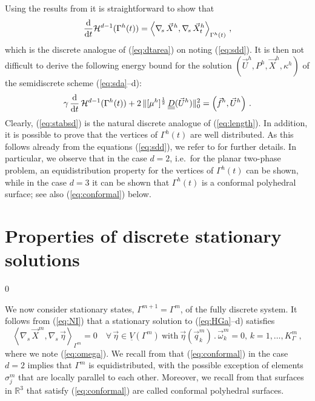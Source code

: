 \documentclass[a4paper,12pt,onecolumn]{article}
\newcommand{\R}{{\mathbb R}}
\newcommand{\Vh}{\underline{V}(\Gamma^m)}
\newcommand{\nabs}{\nabla_{\!s}}
\newcommand{\ddt}{\frac{\rm d}{{\rm d}t}}
\newcommand{\mat}[1]{\underline{\underline{#1}}\rule{0pt}{0pt}}
\begin{document}
Using the results from \cite{gflows3d} it is straightforward to show that
\begin{equation*}
\ddt \mathcal{H}^{d-1}(\Gamma^h(t)) = \left\langle \nabs\,\vec{X}^h, \nabs\,\vec{X}^h_t \right\rangle_{\Gamma^h(t)} \,,
\end{equation*}
which is the discrete analogue of  (\ref{eq:dtarea}) on noting (\ref{eq:sdd}). It is then not difficult to derive the following energy bound for the solution $(\vec U^h, P^h, \vec{X}^h, \kappa^h)$ of the semidiscrete scheme (\ref{eq:sda}--d):
\begin{equation}\label{eq:stabsd}
\gamma\,\ddt\,\mathcal{H}^{d-1}(\Gamma^h(t)) + 2\,\|[\mu^h]^\frac12\,\mat D(\vec U^h)\|^2_{0} = \left(\vec f^h, \vec U^h\right) \,.
\end{equation}
Clearly, (\ref{eq:stabsd}) is the natural discrete analogue of (\ref{eq:length}). In addition, it is possible to prove that the vertices of $\Gamma^h(t)$ are well distributed. As this follows already from the equations (\ref{eq:sdd}), we refer to \cite{triplej,gflows3d} for further details. In particular, we observe that in the case $d=2$, i.e.\ for the planar two-phase problem, an equidistribution property for the vertices of $\Gamma^h(t)$ can be shown, while in the case $d=3$ it can be shown that $\Gamma^h(t)$ is a 
conformal polyhedral surface; see also (\ref{eq:conformal}) below.

\section{Properties of discrete stationary solutions} \label{sec:discrete_solution_properties}
\setcounter{equation} 0

We now consider stationary states, $\Gamma^{m+1} = \Gamma^m$, of the fully discrete system. It follows from (\ref{eq:NI}) that a stationary solution to (\ref{eq:HGa}--d) satisfies
\begin{equation}\label{eq:conformal}
\left\langle \nabs\, \vec X^m,\nabs\,\vec\eta\right\rangle_{\Gamma^m}=0 \quad \forall \,\vec\eta\in \Vh \ \text{with}\ \vec\eta(\vec{q}_k^m)\,.\,\vec\omega_k^{m} = 0,\, k = 1 ,\ldots, K^m_\Gamma \,,
\end{equation}
where we note (\ref{eq:omega}). We recall from \cite{triplej} that (\ref{eq:conformal}) in the case $d=2$ implies that $\Gamma^m$ is
equidistributed, with the possible exception of elements $\sigma^m_j$ that are locally parallel to each other. Moreover, we recall from \cite{gflows3d} that surfaces in $\R^3$ that satisfy (\ref{eq:conformal}) are called conformal polyhedral surfaces.
\end{document}
